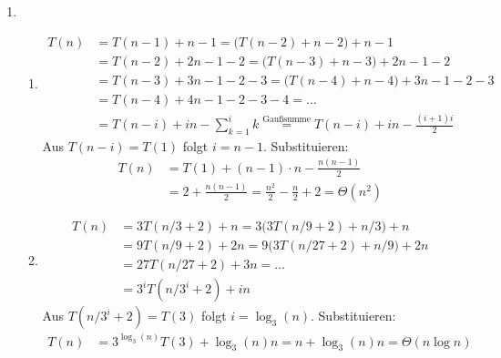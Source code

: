 \documentclass[11pt,a4paper]{article}
\begin{document}
\begin{loesung}
\begin{enumerate}
    \item
    \begin{enumerate}[label=\roman*)]
        \item 
        \begin{align*}
            T(n) &= T(n - 1) + n - 1= \big(T(n - 2) + n - 2\big) + n - 1 \\
            &= T(n - 2) + 2n - 1 - 2 = \big(T(n - 3) + n - 3\big) + 2n - 1 - 2 \\
            &= T(n - 3) + 3n - 1 - 2 - 3 = \big(T(n - 4) + n - 4\big) + 3n - 1 - 2 - 3 \\
            &= T(n - 4) + 4n - 1 - 2 - 3 - 4 = \ldots \\
            &= T(n - i) + in - \sum\limits_{k = 1}^{i} k \overset{\text{Gaußsumme}}{=} T(n - i) + in - \frac{(i + 1)i}{2}
        \end{align*}
        Aus $T(n - i) = T(1)$ folgt $i = n - 1$. Substituieren:
        \begin{align*}
            T(n) &= T(1) + (n - 1) \cdot n - \frac{n(n - 1)}{2} \\
            &= 2 + \frac{n(n - 1)}{2} = \frac{n^2}{2} - \frac{n}{2} + 2 = \Theta(n^2)
        \end{align*}

        \item
        \begin{align*}
            T(n) &= 3T(n / 3 + 2) + n = 3\big(3T(n / 9 + 2) + n / 3\big) + n \\
            &= 9T(n / 9 + 2) + 2n = 9\big(3T(n / 27 + 2) + n / 9\big) + 2n \\
            &= 27T(n / 27 + 2) + 3n = \ldots \\
            &= 3^i T(n / 3^i + 2) + i n 
        \end{align*}
        Aus $T(n / 3^i + 2) = T(3)$ folgt $i = \log_3(n)$. Substituieren:
        \begin{align*}
            T(n) &= 3^{\log_3(n)} T(3) + \log_3(n)n = n + \log_3(n) n = \Theta(n \log n)
        \end{align*}


\end{enumerate}
\end{enumerate}
\end{loesung}
\end{document}
